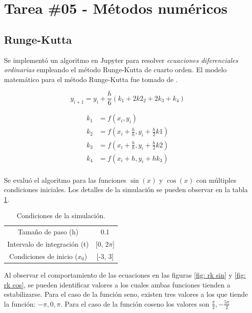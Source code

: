 \documentclass[12pt,letterpaper]{article}
\begin{document}
\section{Tarea \#05 - Métodos numéricos}

\subsection{Runge-Kutta}

Se implementó un algoritmo en Jupyter para resolver \emph{ecuaciones diferenciales ordinarias} empleando el método Runge-Kutta de cuarto orden. El modelo matemático para el método Runge-Kutta fue tomado de \cite{andasari}.

\begin{equation}
 y_{i+1} = y_i + \frac{h}{6} (k_1 + 2k2_2 + 2 k_3 + k_4)
\end{equation}


\begin{equation}
 \begin{split}
  k_1 &= f(x_i, y_i)\\
  k_2 &= f(x_i + \frac{h}{h}, y_i + \frac{h}{2}k1)\\
  k_3 &= f(x_i + \frac{h}{h}, y_i + \frac{h}{2}k2)\\
  k_4 &= f(x_i+h, y_i+h k_3)\\
 \end{split}
\end{equation}


Se evaluó el algoritmo para las funciones $\sin(x)$ y $\cos (x)$ con múltiples condiciones iniciales. Los detalles de la simulación se pueden observar en la tabla \ref{table: simulation}.


 \begin{table}[h]
 \centering
 \begin{tabular}{cc}  
 Tamaño de paso (h) & 0.1\\
 Intervalo de integración (t) & [0, 2$\pi$] \\
 Condiciones de inicio ($x_0$) & [-3, 3]
  \end{tabular} 
\caption{Condiciones de la simulación.}
 \label{table: simulation}
 \end{table}




Al observar el comportamiento de las ecuaciones en las figuras \ref{fig: rk sin} y \ref{fig: rk cos}, se pueden identificar valores a los cuales ambas funciones tienden a estabilizarse. Para el caso de la función seno, existen tres valores a los que tiende la función: $-\pi, 0, \pi$. Para el caso de la función coseno los valores son $\frac{\pi}{2}, -\frac{5\pi}{2}$
\end{document}
